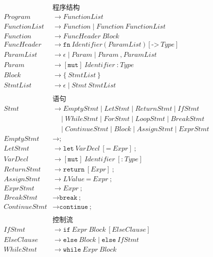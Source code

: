 \documentclass[12pt,a4paper]{ctexart}
\begin{document}
{\allowdisplaybreaks
\begin{align}
&\textbf{程序结构} \\
Program &\rightarrow FunctionList \\
FunctionList &\rightarrow Function \mid Function \ FunctionList \\
Function &\rightarrow FuncHeader \ Block \\
FuncHeader &\rightarrow \texttt{fn} \ Identifier \ \texttt{(} \ ParamList \ \texttt{)} \ [\texttt{->} \ Type] \\
ParamList &\rightarrow \epsilon \mid Param \mid Param \ \texttt{,} \ ParamList \\
Param &\rightarrow [\texttt{mut}] \ Identifier \ \texttt{:} \ Type \\
Block &\rightarrow \texttt{\{} \ StmtList \ \texttt{\}} \\
StmtList &\rightarrow \epsilon \mid Stmt \ StmtList \\
\\
&\textbf{语句} \\
Stmt &\rightarrow EmptyStmt \mid LetStmt \mid ReturnStmt \mid IfStmt \\
     &\quad\mid WhileStmt \mid ForStmt \mid LoopStmt \mid BreakStmt \\
     &\quad\mid ContinueStmt \mid Block \mid AssignStmt \mid ExprStmt \\
EmptyStmt &\rightarrow \texttt{;} \\
LetStmt &\rightarrow \texttt{let} \ VarDecl \ [\texttt{=} \ Expr] \ \texttt{;} \\
VarDecl &\rightarrow [\texttt{mut}] \ Identifier \ [\texttt{:} \ Type] \\
ReturnStmt &\rightarrow \texttt{return} \ [Expr] \ \texttt{;} \\
AssignStmt &\rightarrow LValue \ \texttt{=} \ Expr \ \texttt{;} \\
ExprStmt &\rightarrow Expr \ \texttt{;} \\
BreakStmt &\rightarrow \texttt{break} \ \texttt{;} \\
ContinueStmt &\rightarrow \texttt{continue} \ \texttt{;} \\
\\
&\textbf{控制流} \\
IfStmt &\rightarrow \texttt{if} \ Expr \ Block \ [ElseClause] \\
ElseClause &\rightarrow \texttt{else} \ Block \mid \texttt{else} \ IfStmt \\
WhileStmt &\rightarrow \texttt{while} \ Expr \ Block \\

\end{align}}
\end{document}
